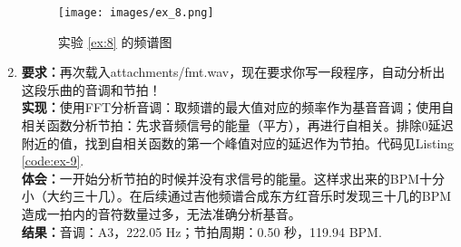 \documentclass[utf8]{article}
\begin{document}
\begin{enumerate}
        \begin{figure}[H]
            \centering
            \texttt{[image: images/ex\_8.png]}
            \caption{实验 \ref{ex:8} 的频谱图}
            \label{fig:ex-8}
        \end{figure}
    \item \label{ex:9}\textbf{要求：}再次载入attachments/fmt.wav，现在要求你写一段程序，自动分析出这段乐曲的音调和节拍！ \\
        \textbf{实现：}使用FFT分析音调：取频谱的最大值对应的频率作为基音音调；使用自相关函数分析节拍：先求音频信号的能量（平方），再进行自相关。排除0延迟附近的值，找到自相关函数的第一个峰值对应的延迟作为节拍。代码见Listing \ref{code:ex-9}. \\
        \textbf{体会：}一开始分析节拍的时候并没有求信号的能量。这样求出来的BPM十分小（大约三十几）。在后续通过吉他频谱合成东方红音乐时发现三十几的BPM造成一拍内的音符数量过多，无法准确分析基音。 \\
        \textbf{结果：}音调：A3，222.05 Hz；节拍周期：0.50 秒，119.94 BPM.
\end{enumerate}
\end{document}
